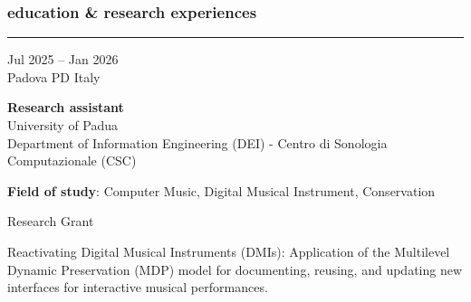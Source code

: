 \documentclass[7pt,a4paper]{article}
\begin{document}
\subsubsection*{education \& research experiences}
\vspace{-0.5cm}
\rule{\textwidth}{0.4pt}
\vspace{0.1cm}


\begin{mdframed}[
    backgroundcolor=entrygray,
    linecolor=entrygray,
    linewidth=0pt,
    innerleftmargin=6pt,
    innerrightmargin=6pt,
    innertopmargin=6pt,
    innerbottommargin=6pt,
    skipabove=0pt,
    skipbelow=0pt
]

\begin{minipage}[t]{0.28\textwidth}

Jul 2025 – Jan 2026
\\\scriptsize Padova PD Italy

\end{minipage}
\begin{minipage}[t]{0.68\textwidth}
\normalsize
\textbf{Research assistant}\\
University of Padua
\\ \small Department of Information Engineering (DEI) - Centro di Sonologia Computazionale (CSC)
\par \vspace{0.1cm} 

\par \scriptsize \textbf{Field of study}: Computer Music, Digital Musical Instrument, Conservation
 

\scriptsize Research Grant

\scriptsize Reactivating Digital Musical Instruments (DMIs): Application of the Multilevel Dynamic Preservation (MDP) model for documenting, reusing, and updating new interfaces for interactive musical performances.

\end{minipage}
\vspace{0.25cm}
\end{mdframed}
\end{document}
